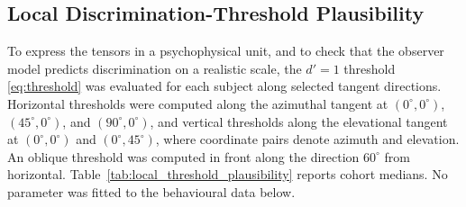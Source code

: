 \documentclass[journal]{IEEEtran}
\begin{document}
\subsection{Local Discrimination-Threshold Plausibility}\label{sec:thresholds}
To express the tensors in a psychophysical unit, and to check that the observer model predicts discrimination on a realistic scale, the \(d'=1\) threshold \eqref{eq:threshold} was evaluated for each subject along selected tangent directions. Horizontal thresholds were computed along the azimuthal tangent at \((0^\circ,0^\circ)\), \((45^\circ,0^\circ)\), and \((90^\circ,0^\circ)\), and vertical thresholds along the elevational tangent at \((0^\circ,0^\circ)\) and \((0^\circ,45^\circ)\), where coordinate pairs denote azimuth and elevation. An oblique threshold was computed in front along the direction \(60^\circ\) from horizontal. Table~\ref{tab:local_threshold_plausibility} reports cohort medians. No parameter was fitted to the behavioural data below.


\end{document}
